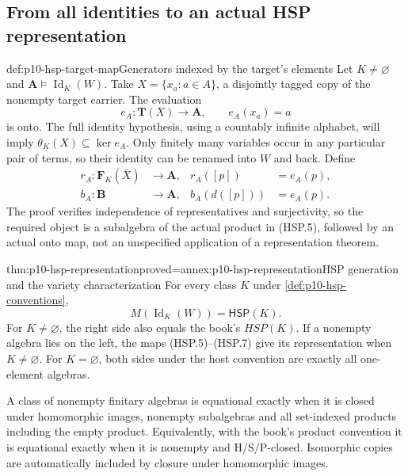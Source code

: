 \subsection{From all identities to an actual HSP representation}
\label{sec:p10-hsp-representation}

\begin{hbmethod}{def:p10-hsp-target-map}{Generators indexed by the target's elements}
Let \(K\ne\varnothing\) and
\(\mathbf A\models\operatorname{Id}_K(W)\).
Take \(X=\{x_a:a\in A\}\), a disjointly tagged copy of the
nonempty target carrier. The evaluation
\[
 e_A:\mathbf T(X)\longrightarrow\mathbf A,\qquad
 e_A(x_a)=a
 \tag{HSP.6}
\]
is onto. The full identity hypothesis, using a countably infinite
alphabet, will imply \(\theta_K(X)\subseteq\ker e_A\).
Only finitely many variables occur in any particular pair of
terms, so their identity can be renamed into \(W\) and back.
Define
\[
 \begin{aligned}
 r_A:\mathbf F_K(\bar X)&\longrightarrow\mathbf A,
          &r_A([p])&=e_A(p),\\
 b_A:\mathbf B&\longrightarrow\mathbf A,
          &b_A(d([p]))&=e_A(p).
 \end{aligned}
 \tag{HSP.7}
\]
The proof verifies independence of representatives and surjectivity,
so the required object is a subalgebra of the actual product
in (HSP.5), followed by an actual onto map, not an unspecified
application of a representation theorem.
\end{hbmethod}

\begin{hbtheorem}{thm:p10-hsp-representation}{proved=annex:p10-hsp-representation}{HSP generation and the variety characterization}
For every class \(K\) under \cref{def:p10-hsp-conventions},
\[
 M(\operatorname{Id}_K(W))=
             \mathsf H\mathsf S\mathsf P(K).
 \tag{HSP.8}
\]
For \(K\ne\varnothing\), the right side also equals the book's
\(HSP(K)\). If a nonempty algebra lies on the left, the maps
(HSP.5)--(HSP.7) give its representation when \(K\ne\varnothing\).
For \(K=\varnothing\), both sides under the host convention are
exactly all one-element algebras.

A class of nonempty finitary algebras is equational exactly when
it is closed under homomorphic images, nonempty subalgebras and
all set-indexed products including the empty product.
Equivalently, with the book's product convention it is equational
exactly when it is nonempty and H/S/P-closed.
Isomorphic copies are automatically included by closure under
homomorphic images.
\end{hbtheorem}

